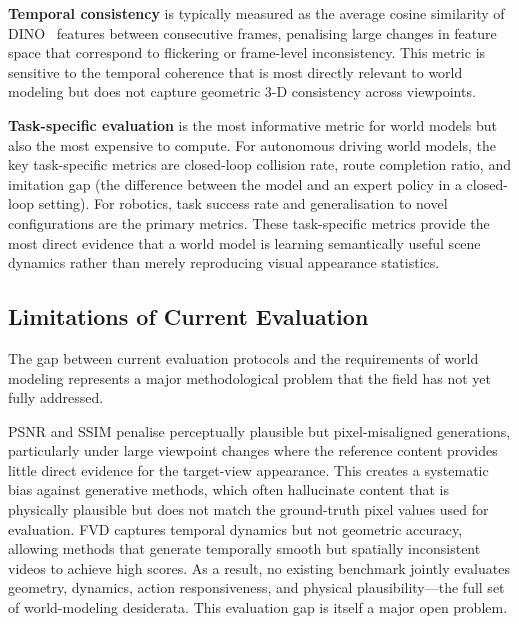 \textbf{Temporal consistency} is typically measured as the average cosine
similarity of DINO~\citep{} features between consecutive frames, penalising
large changes in feature space that correspond to flickering or frame-level
inconsistency.
This metric is sensitive to the temporal coherence that is most directly
relevant to world modeling but does not capture geometric 3-D consistency
across viewpoints.

\textbf{Task-specific evaluation} is the most informative metric for world
models but also the most expensive to compute.
For autonomous driving world models, the key task-specific metrics are
closed-loop collision rate, route completion ratio, and imitation gap
(the difference between the model and an expert policy in a closed-loop setting).
For robotics, task success rate and generalisation to novel configurations
are the primary metrics.
These task-specific metrics provide the most direct evidence that a world
model is learning semantically useful scene dynamics rather than merely
reproducing visual appearance statistics.

\subsection{Limitations of Current Evaluation}

The gap between current evaluation protocols and the requirements of world
modeling represents a major methodological problem that the field has
not yet fully addressed.

PSNR and SSIM penalise perceptually plausible but pixel-misaligned generations,
particularly under large viewpoint changes where the reference content
provides little direct evidence for the target-view appearance.
This creates a systematic bias against generative methods, which often hallucinate
content that is physically plausible but does not match the ground-truth pixel
values used for evaluation.
FVD captures temporal dynamics but not geometric accuracy, allowing methods
that generate temporally smooth but spatially inconsistent videos to achieve
high scores.
As a result, no existing benchmark jointly evaluates geometry, dynamics, action
responsiveness, and physical plausibility---the full set of world-modeling
desiderata.
This evaluation gap is itself a major open problem.

